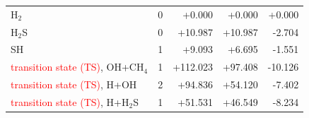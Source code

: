 \begin{tabular}{@{}lc rrr@{}}
H$_2$ & 0 & \textcolor{pyscfred}{+0.000} & \textcolor{pyscfred}{+0.000} & \textcolor{pyscfred}{+0.000} \\
H$_2$S & 0 & \textcolor{pyscfred}{+10.987} & \textcolor{pyscfred}{+10.987} & \textcolor{pyscfred}{-2.704} \\
SH & 1 & \textcolor{pyscfred}{+9.093} & \textcolor{pyscfred}{+6.695} & \textcolor{pyscfred}{-1.551} \\
\textcolor{red}{transition state (TS)}, OH+CH$_4$ & 1 & \textcolor{pyscfred}{+112.023} & \textcolor{pyscfred}{+97.408} & \textcolor{pyscfred}{-10.126} \\
\textcolor{red}{transition state (TS)}, H+OH & 2 & \textcolor{pyscfred}{+94.836} & \textcolor{pyscfred}{+54.120} & \textcolor{pyscfred}{-7.402} \\
\textcolor{red}{transition state (TS)}, H+H$_2$S & 1 & \textcolor{pyscfred}{+51.531} & \textcolor{pyscfred}{+46.549} & \textcolor{pyscfred}{-8.234} \\
\bottomrule
\end{tabular}
